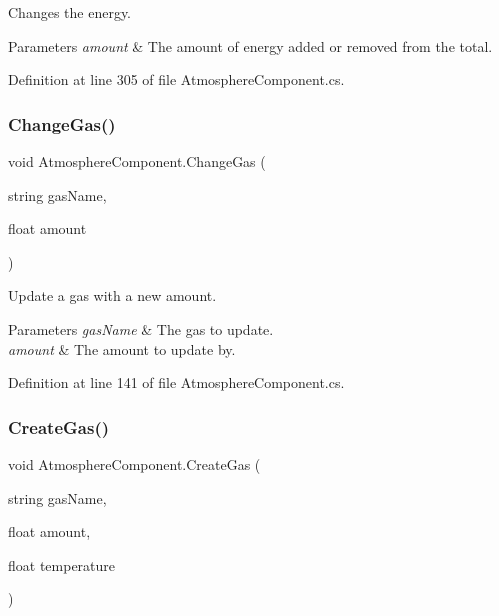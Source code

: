 Changes the energy. 


\begin{DoxyParams}{Parameters}
{\em amount} & The amount of energy added or removed from the total.\\
\hline
\end{DoxyParams}


Definition at line 305 of file Atmosphere\+Component.\+cs.

\mbox{\label{class_atmosphere_component_a5cf504fc9a6e6dda40e0d978826f3b1b}} 
\subsubsection{\texorpdfstring{Change\+Gas()}{ChangeGas()}}
{\footnotesize\ttfamily void Atmosphere\+Component.\+Change\+Gas (\begin{DoxyParamCaption}\item[{string}]{gas\+Name,  }\item[{float}]{amount }\end{DoxyParamCaption})}



Update a gas with a new amount. 


\begin{DoxyParams}{Parameters}
{\em gas\+Name} & The gas to update. \\
\hline
{\em amount} & The amount to update by. \\
\hline
\end{DoxyParams}


Definition at line 141 of file Atmosphere\+Component.\+cs.

\mbox{\label{class_atmosphere_component_a96f96d66987e071cf9c686d807aa699d}} 
\subsubsection{\texorpdfstring{Create\+Gas()}{CreateGas()}}
{\footnotesize\ttfamily void Atmosphere\+Component.\+Create\+Gas (\begin{DoxyParamCaption}\item[{string}]{gas\+Name,  }\item[{float}]{amount,  }\item[{float}]{temperature }\end{DoxyParamCaption})}



